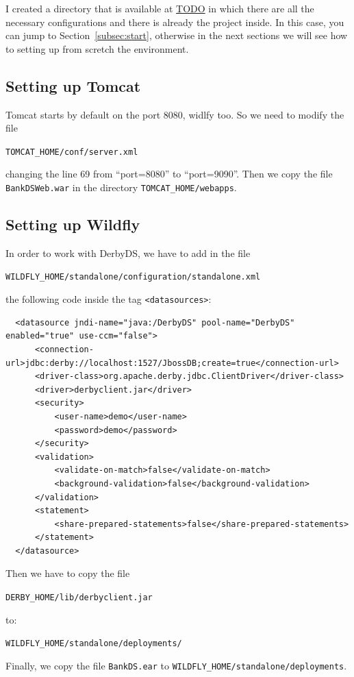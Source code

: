 \documentclass[a4paper]{article}
\begin{document}
\noindent
I created a directory that is available at \url{TODO} in which there are all the necessary configurations and there is already the project inside. In this case, you can jump to Section~\ref{subsec:start}, otherwise in the next sections we will see how to setting up from scretch the environment.
\subsection{Setting up Tomcat}
\label{subsec:tomcat}
Tomcat starts by default on the port 8080, widlfy too. So we need to modify the file 

\verb|TOMCAT_HOME/conf/server.xml|

\noindent
changing the line 69 from ``port=8080'' to ``port=9090''. Then we copy the file \verb|BankDSWeb.war| in the directory \verb|TOMCAT_HOME/webapps|.

\subsection{Setting up Wildfly}
\label{subsec:wildfly}
In order to work with DerbyDS, we have to add in the file

\verb|WILDFLY_HOME/standalone/configuration/standalone.xml|

\noindent
the following code inside the tag \verb|<datasources>|:

\begin{verbatim}
  <datasource jndi-name="java:/DerbyDS" pool-name="DerbyDS" enabled="true" use-ccm="false">
      <connection-url>jdbc:derby://localhost:1527/JbossDB;create=true</connection-url>
      <driver-class>org.apache.derby.jdbc.ClientDriver</driver-class>
      <driver>derbyclient.jar</driver>
      <security>
          <user-name>demo</user-name>
          <password>demo</password>
      </security>
      <validation>
          <validate-on-match>false</validate-on-match>
          <background-validation>false</background-validation>
      </validation>
      <statement>
          <share-prepared-statements>false</share-prepared-statements>
      </statement>
  </datasource>
\end{verbatim}

\noindent
Then we have to copy the file 

\verb|DERBY_HOME/lib/derbyclient.jar|

\noindent
to:

\verb|WILDFLY_HOME/standalone/deployments/|

Finally, we copy the file \verb|BankDS.ear| to \verb|WILDFLY_HOME/standalone/deployments|.
\end{document}
